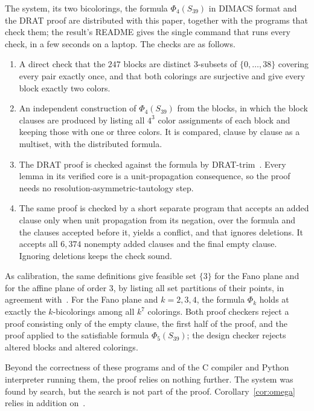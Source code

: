 \documentclass[11pt]{article}
\theoremstyle{definition}
\begin{document}
The system, its two bicolorings, the formula $\Phi_4(S_{39})$ in DIMACS
format and the DRAT proof are distributed with this paper, together with
the programs that check them; the result's README gives the single
command that runs every check, in a few seconds on a laptop. The checks
are as follows.
\begin{enumerate}
\item A direct check that the $247$ blocks are distinct $3$-subsets of
  $\{0,\dots,38\}$ covering every pair exactly once, and that both colorings
  are surjective and give every block exactly two colors.
\item An independent construction of $\Phi_4(S_{39})$ from the blocks,
  in which the block clauses are produced by listing all $4^3$ color
  assignments of each block and keeping those with one or three colors.
  It is compared, clause by clause as a multiset, with the distributed
  formula.
\item The DRAT proof is checked against the formula by
  DRAT-trim~\cite{DRATtrim}. Every lemma in its verified core is a
  unit-propagation consequence, so the proof needs no
  resolution-asymmetric-tautology step.
\item The same proof is checked by a short separate program that accepts an
  added clause only when unit propagation from its negation, over the
  formula and the clauses accepted before it, yields a conflict, and that
  ignores deletions. It accepts all $6{,}374$ nonempty added clauses and
  the final empty clause. Ignoring deletions keeps the check sound.
\end{enumerate}
As calibration, the same definitions give feasible set $\{3\}$ for the
Fano plane and for the affine plane of order $3$, by listing all set
partitions of their points, in agreement with~\cite[table at the end of
Section~3]{GGMV14}. For the Fano plane and $k=2,3,4$, the formula
$\Phi_k$ holds at exactly the $k$-bicolorings among all $k^7$ colorings.
Both proof checkers reject a proof consisting only of the empty clause,
the first half of the proof, and the proof applied to the satisfiable
formula $\Phi_5(S_{39})$; the design checker rejects altered blocks and
altered colorings.

Beyond the correctness of these programs and of the C compiler and Python
interpreter running them, the proof relies on nothing further. The
system was found by search, but the search is not part of the proof.
Corollary~\ref{cor:omega} relies in addition on~\cite[Theorem~3.7]{GGMV14}.
\end{document}
